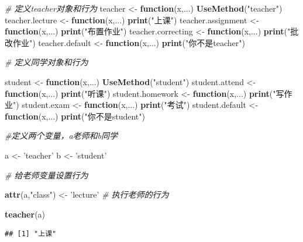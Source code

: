\documentclass[]{book}
\newenvironment{Shaded}{\begin{snugshade}}{\end{snugshade}}
\newcommand{\KeywordTok}[1]{\textcolor[rgb]{0.13,0.29,0.53}{\textbf{#1}}}
\newcommand{\StringTok}[1]{\textcolor[rgb]{0.31,0.60,0.02}{#1}}
\newcommand{\CommentTok}[1]{\textcolor[rgb]{0.56,0.35,0.01}{\textit{#1}}}
\newcommand{\ControlFlowTok}[1]{\textcolor[rgb]{0.13,0.29,0.53}{\textbf{#1}}}
\newcommand{\NormalTok}[1]{#1}
\begin{document}
\begin{Shaded}
\begin{Highlighting}[]
\CommentTok{# 定义teacher对象和行为}
\NormalTok{teacher <-}\StringTok{ }\ControlFlowTok{function}\NormalTok{(x,...) }\KeywordTok{UseMethod}\NormalTok{(}\StringTok{"teacher"}\NormalTok{)}
\NormalTok{teacher.lecture <-}\StringTok{ }\ControlFlowTok{function}\NormalTok{(x,...) }\KeywordTok{print}\NormalTok{(}\StringTok{"上课"}\NormalTok{)}
\NormalTok{teacher.assignment <-}\StringTok{ }\ControlFlowTok{function}\NormalTok{(x,...) }\KeywordTok{print}\NormalTok{(}\StringTok{"布置作业"}\NormalTok{)}
\NormalTok{teacher.correcting <-}\StringTok{ }\ControlFlowTok{function}\NormalTok{(x,...) }\KeywordTok{print}\NormalTok{(}\StringTok{"批改作业"}\NormalTok{)}
\NormalTok{teacher.default <-}\StringTok{ }\ControlFlowTok{function}\NormalTok{(x,...) }\KeywordTok{print}\NormalTok{(}\StringTok{"你不是teacher"}\NormalTok{)}

\CommentTok{# 定义同学对象和行为}

\NormalTok{student <-}\StringTok{ }\ControlFlowTok{function}\NormalTok{(x,...) }\KeywordTok{UseMethod}\NormalTok{(}\StringTok{"student"}\NormalTok{)}
\NormalTok{student.attend <-}\StringTok{ }\ControlFlowTok{function}\NormalTok{(x,...) }\KeywordTok{print}\NormalTok{(}\StringTok{"听课"}\NormalTok{)}
\NormalTok{student.homework <-}\StringTok{ }\ControlFlowTok{function}\NormalTok{(x,...) }\KeywordTok{print}\NormalTok{(}\StringTok{"写作业"}\NormalTok{)}
\NormalTok{student.exam <-}\StringTok{ }\ControlFlowTok{function}\NormalTok{(x,...) }\KeywordTok{print}\NormalTok{(}\StringTok{"考试"}\NormalTok{)}
\NormalTok{student.default <-}\StringTok{ }\ControlFlowTok{function}\NormalTok{(x,...) }\KeywordTok{print}\NormalTok{(}\StringTok{"你不是student"}\NormalTok{)}

\CommentTok{#定义两个变量，a老师和b同学}

\NormalTok{a <-}\StringTok{ 'teacher'}
\NormalTok{b <-}\StringTok{ 'student'}

\CommentTok{# 给老师变量设置行为}

\KeywordTok{attr}\NormalTok{(a,}\StringTok{"class"}\NormalTok{) <-}\StringTok{ 'lecture'}
\CommentTok{# 执行老师的行为}

\KeywordTok{teacher}\NormalTok{(a)}
\end{Highlighting}
\end{Shaded}

\begin{verbatim}
## [1] "上课"
\end{verbatim}
\end{document}
